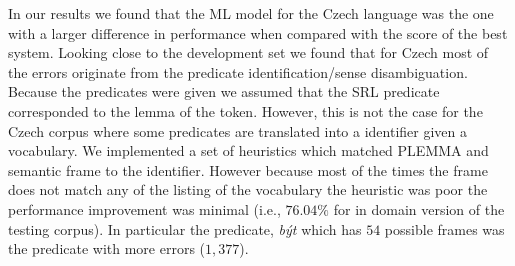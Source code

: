 
In our results we found that the ML model for the Czech language was the one 
with a larger difference in performance when compared with the score of the best 
system. Looking close to the development set we found that for Czech most of the 
errors originate from the predicate identification/sense disambiguation.  
Because the predicates were given we assumed that the SRL predicate corresponded 
to the lemma of the token.  However, this is not the case for the Czech corpus 
where some predicates are translated into a identifier given a vocabulary. We 
implemented a set of heuristics which matched PLEMMA and semantic frame to the 
identifier.  However because most of the times the frame does not match any of 
the listing of the vocabulary the heuristic was poor the performance improvement 
was minimal (i.e., $76.04\%$ for in domain version of the testing corpus). In 
particular the predicate, \emph{být} which has $54$ possible frames was the 
predicate with more errors ($1,377$). 



